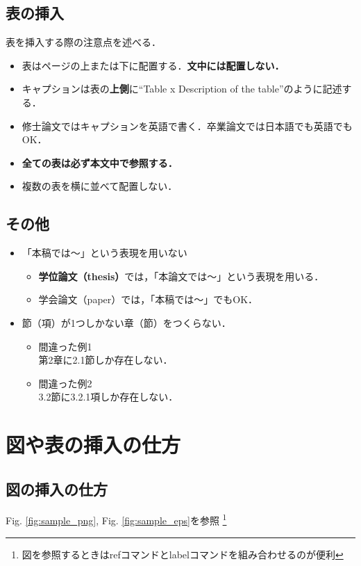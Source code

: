\documentclass[12pt]{sonota/aislab}
\begin{document}
\subsection{表の挿入}
表を挿入する際の注意点を述べる．
\begin{itemize}
\item 表はページの上または下に配置する．{\bf 文中には配置しない．}
\item キャプションは表の{\bf 上側}に``Table x Description of the table''のように記述する．
\item 修士論文ではキャプションを英語で書く．卒業論文では日本語でも英語でもOK．
\item {\bf 全ての表は必ず本文中で参照する．}
\item 複数の表を横に並べて配置しない．
\end{itemize}

\subsection{その他}
\begin{itemize}
\item 「本稿では～」という表現を用いない
	\begin{itemize}
	\item {\bf 学位論文（thesis）}では，「本論文では～」という表現を用いる．
	\item 学会論文（paper）では，「本稿では～」でもOK．
	\end{itemize}
\item 節（項）が1つしかない章（節）をつくらない．
	\begin{itemize}
	\item 間違った例1\\第2章に2.1節しか存在しない．
	\item 間違った例2\\3.2節に3.2.1項しか存在しない．
	\end{itemize}
\end{itemize}


\section{図や表の挿入の仕方}

\subsection{図の挿入の仕方}
Fig. \ref{fig:sample_png}, Fig. \ref{fig:sample_eps}を参照
\footnote{図を参照するときはrefコマンドとlabelコマンドを組み合わせるのが便利}
\end{document}
